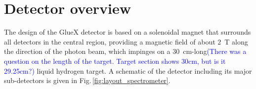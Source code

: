 
\section[Detector overview]{Detector overview \label{sec:overview}}
The design of the GlueX detector \cite{Ghoul:2015ifw} is based on a solenoidal magnet that surrounds all detectors in the central region, providing a magnetic field of about $2$~T along the direction of the photon beam, which impinges on a 
$30$~cm-long\textcolor{blue}{(There was a question on the length of the target. Target section shows 30cm, but is it 29.25cm?)} liquid hydrogen target.  A schematic of the detector including its major sub-detectors is given in Fig.\,\ref{fig:layout_spectrometer}.


